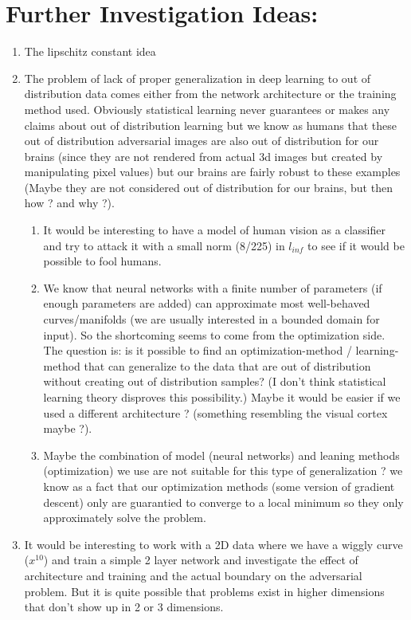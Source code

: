 \documentclass[../thesis.tex]{subfiles}
\begin{document}
\section{Further Investigation Ideas:}

	\begin{enumerate}
		
		\item The lipschitz constant idea
		
		\item The problem of lack of proper generalization in deep learning to out of distribution data comes either from the network architecture or the training method used. Obviously statistical learning never guarantees or makes any claims about out of distribution learning but we know as humans that these out of distribution adversarial images are also out of distribution for our brains (since they are not rendered from actual 3d images but created by manipulating pixel values) but our brains are fairly robust to these examples (Maybe they are not considered out of distribution for our brains, but then how ? and why ?). 
		
		\begin{enumerate}
			\item It would be interesting to have a model of human vision as a classifier and try to attack it with a small norm (8/225) in $l_{inf}$ to see if it would be possible to fool humans.
			
			\item We know that neural networks with a finite number of parameters (if enough parameters are added) can approximate most well-behaved curves/manifolds (we are usually interested in a bounded domain for input). So the shortcoming seems to come from the optimization side. The question is: is it possible to find an optimization-method / learning-method that can generalize to the data that are out of distribution without creating out of distribution samples? (I don't think statistical learning theory disproves this possibility.) Maybe it would be easier if we used a different architecture ? (something resembling the visual cortex maybe ?).
			
			\item Maybe the combination of model (neural networks) and leaning methods (optimization) we use are not suitable for this type of generalization ? we know as a fact that our optimization methods (some version of gradient descent) only are guarantied to converge to a local minimum so they only approximately solve the problem.    
			
			  
		\end{enumerate}
	
		\item It would be interesting to work with a 2D data where we have a wiggly curve ($x^10$) and train a simple 2 layer network and investigate the effect of architecture and training and the actual boundary on the adversarial problem. But it is quite possible that problems exist in higher dimensions that don't show up in 2 or 3 dimensions. 
		
		
		
	\end{enumerate}
	
	
\end{document}
